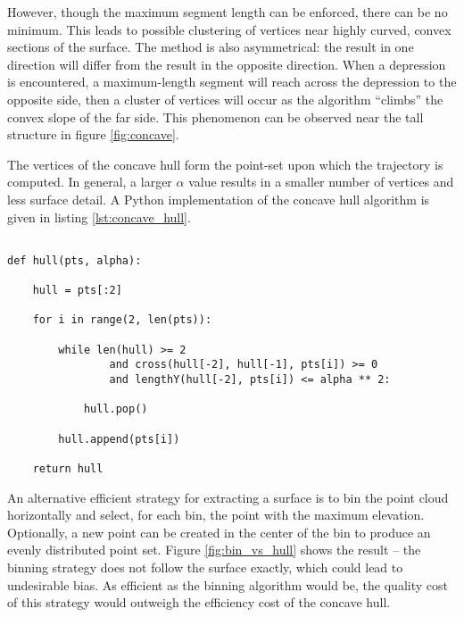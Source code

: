 \documentclass[doc]{apa6}
\begin{document}
However, though the maximum segment length can be enforced, there can be no minimum. This leads to possible clustering of vertices near highly curved, convex sections of the surface. The method is also asymmetrical: the result in one direction will differ from the result in the opposite direction. When a depression is encountered, a maximum-length segment will reach across the depression to the opposite side, then a cluster of vertices will occur as the algorithm ``climbs'' the convex slope of the far side. This phenomenon can be observed near the tall structure in figure \ref{fig:concave}.

The vertices of the concave hull form the point-set upon which the trajectory is computed. In general, a larger $\alpha$ value results in a smaller number of vertices and less surface detail. A Python implementation of the concave hull algorithm is given in listing \ref{lst:concave_hull}. 

\begin{listing}
\begin{verbatim}

def hull(pts, alpha):

	hull = pts[:2]

	for i in range(2, len(pts)):
	
		while len(hull) >= 2 
				and cross(hull[-2], hull[-1], pts[i]) >= 0 
				and lengthY(hull[-2], pts[i]) <= alpha ** 2:

			hull.pop()

		hull.append(pts[i])

	return hull

\end{verbatim}
\caption{Modified Monotone Chain algorithm for constructing a convex hull. The \lstinline{cross} function determines whether the segment makes a clockwise or counterclockwise turn; \lstinline{lengthY} gives the squared distance between points in $y$. The \lstinline{pts} array is a list of points, sorted on $y$; \lstinline{alpha} is the maximum segment length.}
\label{lst:concave_hull}
\end{listing}

An alternative efficient strategy for extracting a surface is to bin the point cloud horizontally and select, for each bin, the point with the maximum elevation. Optionally, a new point can be created in the center of the bin to produce an evenly distributed point set. Figure \ref{fig:bin_vs_hull} shows the result -- the binning strategy does not follow the surface exactly, which could lead to undesirable bias. As efficient as the binning algorithm would be, the quality cost of this strategy would outweigh the efficiency cost of the concave hull.
\end{document}
